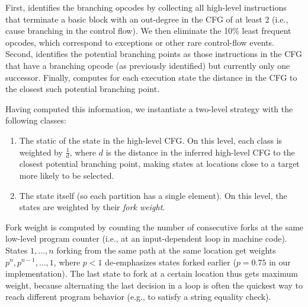 First, \chef identifies the branching opcodes by collecting all high-level instructions that terminate a basic block with an out-degree in the CFG of at least $2$ (i.e., cause branching in the control flow).   We then eliminate the 10\% least frequent opcodes, which correspond to exceptions or other rare control-flow events.
%
Second, \chef identifies the potential branching points as those instructions in the CFG that have a branching opcode (as previously identified) but currently only one successor.
%
Finally, \chef computes for each execution state the distance in the CFG to the closest such potential branching point.

Having computed this information, we instantiate a two-level \cupa strategy with the following classes:
\begin{enumerate}
\item The static \hlpc of the state in the high-level CFG.  On this level, each class is weighted by $\frac{1}{d}$, where $d$ is the distance in the inferred high-level CFG to the closest potential branching point, making states at locations close to a target more likely to be selected.
\item The state itself (so each partition has a single element).  On this level, the states are weighted by their \textit{fork weight}.
\end{enumerate}

Fork weight is computed by counting the number of consecutive forks at the same low-level program counter (i.e., at an input-dependent loop in machine code).  States $1, \ldots, n$ forking from the same path at the same location get weights $p^n, p^{n-1}, \ldots, 1$, where $p < 1$ de-emphasizes states forked earlier ($p = 0.75$ in our implementation).  The last state to fork at a certain location thus gets maximum weight, because alternating the last decision in a loop is often the quickest way to reach different program behavior (e.g., to satisfy a string equality check).


